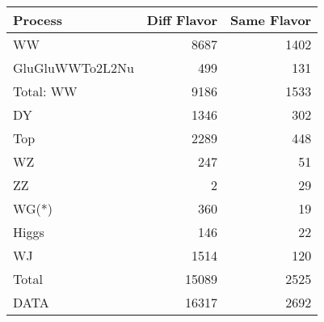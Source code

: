 \begin{table}[ht]
	\centering
\begin{tabular}{lrr}

         Process &  Diff Flavor &  Same Flavor \\
		\hline
              WW &         8687 &         1402 \\
 GluGluWWTo2L2Nu &          499 &          131 \\
\hline
       Total: WW &         9186 &         1533 \\
              DY &         1346 &          302 \\
             Top &         2289 &          448 \\
              WZ &          247 &           51 \\
              ZZ &            2 &           29 \\
           WG(*) &          360 &           19 \\
           Higgs &          146 &           22 \\
              WJ &         1514 &          120 \\
\hline
           Total &        15089 &         2525 \\
            DATA &        16317 &         2692 \\


\end{tabular}

\end{table}